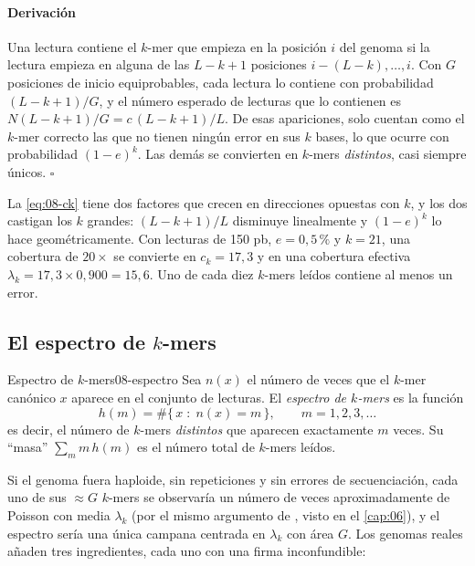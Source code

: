 \paragraph{Derivación} Una lectura contiene el $k$-mer que empieza en la posición $i$ del genoma si la lectura empieza en alguna de las $L-k+1$ posiciones $i-(L-k),\dots,i$. Con $G$ posiciones de inicio equiprobables, cada lectura lo contiene con probabilidad $(L-k+1)/G$, y el número esperado de lecturas que lo contienen es $N(L-k+1)/G = c\,(L-k+1)/L$. De esas apariciones, solo cuentan como el $k$-mer correcto las que no tienen ningún error en sus $k$ bases, lo que ocurre con probabilidad $(1-e)^k$. Las demás se convierten en $k$-mers \emph{distintos}, casi siempre únicos. $\square$

La \cref{eq:08-ck} tiene dos factores que crecen en direcciones opuestas con $k$, y los dos castigan los $k$ grandes: $(L-k+1)/L$ disminuye linealmente y $(1-e)^k$ lo hace geométricamente. Con lecturas de 150 pb, $e=0{,}5\,\%$ y $k=21$, una cobertura de $20\times$ se convierte en $c_k=17{,}3$ y en una cobertura efectiva $\lambda_k=17{,}3\times0{,}900=15{,}6$. Uno de cada diez $k$-mers leídos contiene al menos un error.

\subsection{El espectro de \texorpdfstring{$k$}{k}-mers}

\begin{definicion}{Espectro de $k$-mers}{08-espectro}
Sea $n(x)$ el número de veces que el $k$-mer canónico $x$ aparece en el conjunto de lecturas. El \emph{espectro de $k$-mers} es la función
\begin{equation}\label{eq:08-espectro}
h(m) = \#\{\,x \;:\; n(x)=m\,\},\qquad m=1,2,3,\dots
\end{equation}
es decir, el número de $k$-mers \emph{distintos} que aparecen exactamente $m$ veces. Su ``masa'' $\sum_m m\,h(m)$ es el número total de $k$-mers leídos.
\end{definicion}

\begin{simbolos}
\end{simbolos}

Si el genoma fuera haploide, sin repeticiones y sin errores de secuenciación, cada uno de sus $\approx G$ $k$-mers se observaría un número de veces aproximadamente de Poisson con media $\lambda_k$ (por el mismo argumento de \textcite{c08-lander1988}, visto en el \cref{cap:06}), y el espectro sería una única campana centrada en $\lambda_k$ con área $G$. Los genomas reales añaden tres ingredientes, cada uno con una firma inconfundible:

